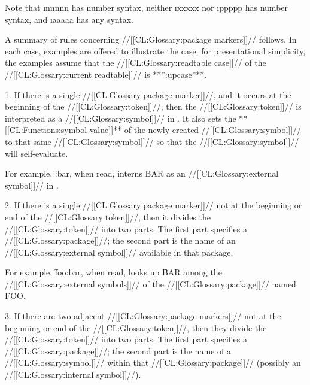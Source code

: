 Note that \i{nnnnn} has number syntax,
          neither \i{xxxxx} nor \i{ppppp} has number syntax,
      and \i{aaaaa} has any syntax.


A summary of rules concerning //[[CL:Glossary:package markers]]// follows.
In each case, examples are offered to illustrate the case;
for presentational simplicity, the examples assume that
the //[[CL:Glossary:readtable case]]// of the //[[CL:Glossary:current readtable]]// is **'':upcase''**.



\beginlist                                           
\item{1.}
If there is a single //[[CL:Glossary:package marker]]//, and it occurs at the beginning of the
//[[CL:Glossary:token]]//, then the //[[CL:Glossary:token]]// is interpreted as a //[[CL:Glossary:symbol]]// in .
It also sets the **[[CL:Functions:symbol-value]]** of the newly-created //[[CL:Glossary:symbol]]// to that
same //[[CL:Glossary:symbol]]// so that the //[[CL:Glossary:symbol]]// will self-evaluate.

For example, 
\f{:bar}, when read, interns \f{BAR} as an //[[CL:Glossary:external symbol]]// in .




\item{2.}
If there is a single //[[CL:Glossary:package marker]]// not at the beginning or end of the
//[[CL:Glossary:token]]//, then it divides the //[[CL:Glossary:token]]// into two parts.  The first part
specifies a //[[CL:Glossary:package]]//; 
the second part is the name of an //[[CL:Glossary:external symbol]]//
available in that package.  

For example, 
\f{foo:bar}, when read, looks up \f{BAR} among the //[[CL:Glossary:external symbols]]// of
the //[[CL:Glossary:package]]// named \f{FOO}.













\item{3.}
If there are two adjacent //[[CL:Glossary:package markers]]// not at the beginning or end of the
//[[CL:Glossary:token]]//, then they divide the //[[CL:Glossary:token]]// into two parts.  The first part
specifies a //[[CL:Glossary:package]]//;
the second part is the name of a //[[CL:Glossary:symbol]]// within
that //[[CL:Glossary:package]]// (possibly an //[[CL:Glossary:internal symbol]]//).

